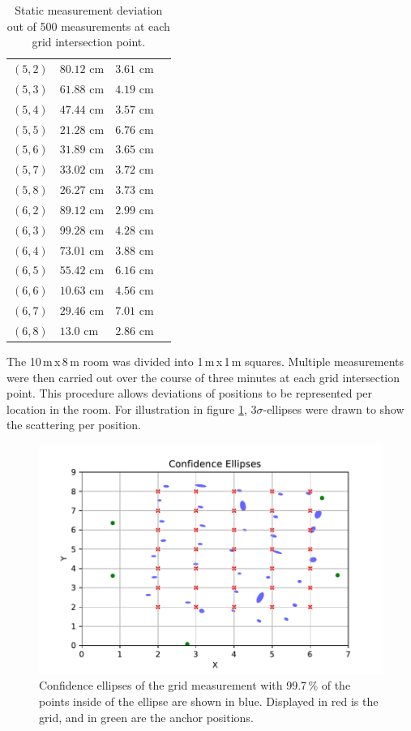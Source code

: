 \documentclass[conference, a4paper]{IEEEtran}
\begin{document}
\begin{table}[hbt!]
\begin{tabular}{l l l c}
		$(5,2)$ & $80.12$ cm & $3.61$ cm\\
		$(5,3)$ & $61.88$ cm & $4.19$ cm\\
		$(5,4)$ & $47.44$ cm & $3.57$ cm\\
		$(5,5)$ & $21.28$ cm & $6.76$ cm\\
		$(5,6)$ & $31.89$ cm & $3.65$ cm\\
		$(5,7)$ & $33.02$ cm & $3.72$ cm\\
		$(5,8)$ & $26.27$ cm & $3.73$ cm\\

		$(6,2)$ & $89.12$ cm & $2.99$ cm\\
		$(6,3)$ & $99.28$ cm & $4.28$ cm\\
		$(6,4)$ & $73.01$ cm & $3.88$ cm\\
		$(6,5)$ & $55.42$ cm & $6.16$ cm\\
		$(6,6)$ & $10.63$ cm & $4.56$ cm\\
		$(6,7)$ & $29.46$ cm & $7.01$ cm\\
		$(6,8)$ & $13.0$ cm & $2.86$ cm\\
		
	\end{tabular}
	\caption{Static measurement deviation out of 500 measurements at each grid intersection point.}
	\label{table:measurements}
\end{table}

The 10\,m\,x\,8\,m room was divided into 1\,m\,x\,1\,m squares. 
Multiple measurements were then carried out over the course of three minutes at each grid intersection point.
This procedure allows deviations of positions to be represented per location in the room.
For illustration in figure \ref{fig:statistics}, $3\sigma$-ellipses were drawn to show the scattering per position.

\begin{figure}[hbt!]
	\includegraphics[scale=0.63]{pic/position_plot.pdf}
	\caption{Confidence ellipses of the grid measurement with 99.7\,\% of the points inside of the ellipse are shown in blue.
	Displayed in red is the grid, and in green are the anchor positions.}
	\label{fig:statistics}
\end{figure}
\end{document}
